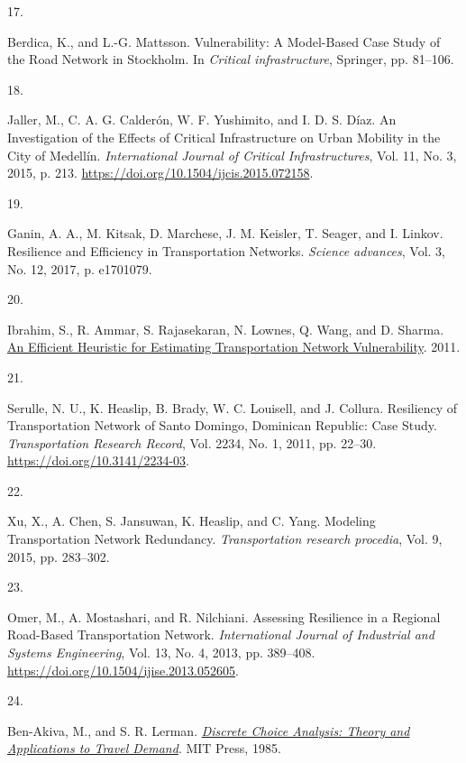 \documentclass[
  letterpaper,
]{trb}
\newlength{\cslhangindent}
\newlength{\csllabelwidth}
\newlength{\cslentryspacingunit} %
\newenvironment{CSLReferences}[2] %
 {%
  \setlength{\parindent}{0pt}
  \ifodd #1
  \let\oldpar\par
  \def\par{\hangindent=\cslhangindent\oldpar}
  \fi
  \setlength{\parskip}{#2\cslentryspacingunit}
 }%
 {}
\newcommand{\CSLLeftMargin}[1]{\parbox[t]{\csllabelwidth}{#1}}
\newcommand{\CSLRightInline}[1]{\parbox[t]{\linewidth - \csllabelwidth}{#1}\break}
\begin{document}
\begin{CSLReferences}{0}{0}
\leavevmode{}%
\CSLLeftMargin{17. }%
\CSLRightInline{Berdica, K., and L.-G. Mattsson. Vulnerability: A
Model-Based Case Study of the Road Network in Stockholm. In
\emph{Critical infrastructure}, Springer, pp. 81--106.}

\leavevmode{}%
\CSLLeftMargin{18. }%
\CSLRightInline{Jaller, M., C. A. G. Calderón, W. F. Yushimito, and I.
D. S. Díaz. An Investigation of the Effects of Critical Infrastructure
on Urban Mobility in the City of Medellín. \emph{International Journal
of Critical Infrastructures}, Vol. 11, No. 3, 2015, p. 213.
\url{https://doi.org/10.1504/ijcis.2015.072158}.}

\leavevmode{}%
\CSLLeftMargin{19. }%
\CSLRightInline{Ganin, A. A., M. Kitsak, D. Marchese, J. M. Keisler, T.
Seager, and I. Linkov. Resilience and Efficiency in Transportation
Networks. \emph{Science advances}, Vol. 3, No. 12, 2017, p. e1701079.}

\leavevmode{}%
\CSLLeftMargin{20. }%
\CSLRightInline{Ibrahim, S., R. Ammar, S. Rajasekaran, N. Lownes, Q.
Wang, and D. Sharma. \href{https://doi.org/10.1109/ISCC.2011.5983988}{An
Efficient Heuristic for Estimating Transportation Network
Vulnerability}. 2011.}

\leavevmode{}%
\CSLLeftMargin{21. }%
\CSLRightInline{Serulle, N. U., K. Heaslip, B. Brady, W. C. Louisell,
and J. Collura. Resiliency of Transportation Network of Santo Domingo,
Dominican Republic: Case Study. \emph{Transportation Research Record},
Vol. 2234, No. 1, 2011, pp. 22--30.
\url{https://doi.org/10.3141/2234-03}.}

\leavevmode{}%
\CSLLeftMargin{22. }%
\CSLRightInline{Xu, X., A. Chen, S. Jansuwan, K. Heaslip, and C. Yang.
Modeling Transportation Network Redundancy. \emph{Transportation
research procedia}, Vol. 9, 2015, pp. 283--302.}

\leavevmode{}%
\CSLLeftMargin{23. }%
\CSLRightInline{Omer, M., A. Mostashari, and R. Nilchiani. Assessing
Resilience in a Regional Road-Based Transportation Network.
\emph{International Journal of Industrial and Systems Engineering}, Vol.
13, No. 4, 2013, pp. 389--408.
\url{https://doi.org/10.1504/ijise.2013.052605}.}

\leavevmode{}%
\CSLLeftMargin{24. }%
\CSLRightInline{Ben-Akiva, M., and S. R. Lerman.
\emph{\href{https://www.jstor.org/stable/1391567?origin=crossref}{Discrete
Choice Analysis: Theory and Applications to Travel Demand}}. MIT Press,
1985.}


\end{CSLReferences}
\end{document}
